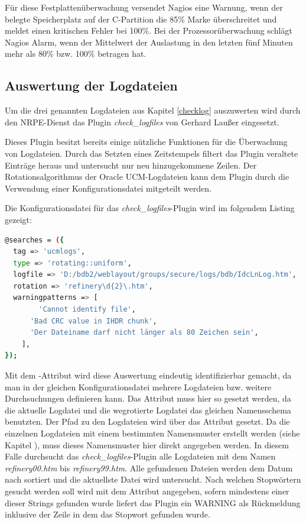 Für diese Festplattenüberwachung versendet Nagios eine Warnung, wenn der belegte Speicherplatz auf der C-Partition die 85\% Marke überschreitet und meldet einen kritischen Fehler bei 100\%.
Bei der Prozessorüberwachung schlägt Nagios Alarm, wenn der Mittelwert der Auslastung in den letzten fünf Minuten mehr als 80\% bzw. 100\%  betragen hat.




\subsection{Auswertung der Logdateien}

Um die drei genannten Logdateien aus Kapitel \ref{checklog} auszuwerten wird durch den \gls{NRPE}-Dienst das Plugin \textit{check\_logfiles} von Gerhard Laußer eingesetzt.

Dieses Plugin besitzt bereits einige nützliche Funktionen für die Überwachung von Logdateien.
Durch das Setzten eines Zeitstempels filtert das Plugin veraltete Einträge heraus und untersucht nur neu hinzugekommene Zeilen.
Der Rotationsalgorithmus der Oracle UCM-Logdateien kann dem Plugin durch die Verwendung einer Konfigurationsdatei mitgeteilt werden.

Die Konfigurationsdatei für das \textit{check\_logfiles}-Plugin wird im folgendem Listing gezeigt:


\begin{lstlisting}[captionpos=b, caption=Konfigurationsdatei für \textit{check\_logfiles}, label=chklogcfg, breaklines = true, language=sh]
@searches = ({
  tag => 'ucmlogs',
  type => 'rotating::uniform',
  logfile => 'D:/bdb2/weblayout/groups/secure/logs/bdb/IdcLnLog.htm',
  rotation => 'refinery\d{2}\.htm',
  warningpatterns => [
        'Cannot identify file',
	  'Bad CRC value in IHDR chunk',
	  'Der Dateiname darf nicht länger als 80 Zeichen sein',
    ],
});
\end{lstlisting}

Mit dem -Attribut wird diese Auswertung eindeutig identifizierbar gemacht, da man in der gleichen Konfigurationsdatei mehrere Logdateien bzw. weitere Durchsuchungen definieren kann.
Das Attribut  muss hier so gesetzt werden, da die aktuelle Logdatei und die wegrotierte Logdatei das gleichen Namensschema benutzten.
Der Pfad zu den Logdateien wird über das Attribut  gesetzt.
Da die einzelnen Logdateien mit einem bestimmten Namensmuster erstellt werden (siehe Kapitel \cite{checklog}), muss dieses Namensmuster hier direkt angegeben werden.
In diesem Falle durchsucht das \textit{check\_logfiles}-Plugin alle Logdateien mit dem Namen \textit{refinery00.htm} bis \textit{refinery99.htm}.
Alle gefundenen Dateien werden dem Datum nach sortiert und die aktuellste Datei wird untersucht.
Nach welchen Stopwörtern gesucht werden soll wird mit dem Attribut  angegeben, sofern mindestens einer dieser Strings gefunden wurde liefert das Plugin ein WARNING als Rückmeldung inklusive der Zeile in dem das Stopwort gefunden wurde.

